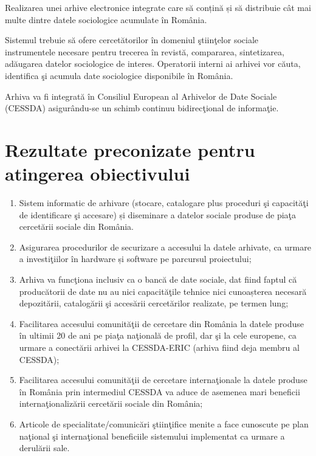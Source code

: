 \documentclass[a4paper, 10pt]{article}
\begin{document}
{{
\foreignlanguage{english}{Realizarea }\foreignlanguage{romanian}{unei arhive electronice integrate care s\u{a}
con\c{t}in\u{a} \c{s}i s\u{a} distribuie c\^at mai multe dintre datele sociologice acumulate \^in Rom\^ania.}}

Sistemul trebuie s\u{a} ofere cercet\u{a}torilor \^in domeniul \c{s}tiin\c{t}elor sociale instrumentele necesare pentru
trecerea \^in revist\u{a}, compararea, sintetizarea, ad\u{a}ugarea datelor sociologice de interes. Operatorii interni
ai arhivei vor c\u{a}uta, identifica \c{s}i acumula date sociologice disponibile \^in Rom\^ania.

Arhiva va fi integrat\u{a} \^in Consiliul European al Arhivelor de Date Sociale (CESSDA) asigur\^andu-se un schimb
continuu bidirec\c{t}ional de informa\c{t}ie.

\section{Rezultate preconizate pentru atingerea obiectivului}

\begin{enumerate}
\item {
Sistem informatic de arhivare (stocare, catalogare plus proceduri \c{s}i capacit\u{a}\c{t}i de identificare \c{s}i
accesare) \foreignlanguage{romanian}{\c{s}}i diseminare a datelor sociale produse de pia\c{t}a cercet\u{a}rii sociale
din Rom\^ania.}
\item {
Asigurarea procedurilor de securizare a accesului la datele arhivate, ca urmare a investi\c{t}iilor \^in hardware
\foreignlanguage{romanian}{\c{s}}i software pe parcursul proiectului;}
\item {
\foreignlanguage{romanian}{Arhiva }va func\c{t}iona inclusiv ca o banc\u{a} de date sociale, dat fiind faptul c\u{a}
produc\u{a}torii de date nu au nici capacit\u{a}\c{t}ile tehnice nici \foreignlanguage{romanian}{cunoa\c{s}terea}
necesar\u{a} depozit\u{a}rii, catalog\u{a}rii \c{s}i acces\u{a}rii cercet\u{a}rilor realizate, pe termen lung;}
\item {
Facilitarea accesului comunit\u{a}\c{t}ii de cercetare din Rom\^ania la datele produse \^in ultimii 20 de ani pe
pia\c{t}a na\c{t}ional\u{a} de profil, dar \c{s}i la cele europene, ca urmare a conect\u{a}rii arhivei la CESSDA-ERIC
(arhiva fiind deja membru al CESSDA);}
\item {
Facilitarea accesului comunit\u{a}\c{t}ii de cercetare interna\c{t}ionale la datele produse \^in Rom\^ania prin
intermediul CESSDA va aduce de asemenea mari beneficii interna\c{t}ionaliz\u{a}rii cercet\u{a}rii sociale din
Rom\^ania;}
\item {
Articole de specialitate/comunic\u{a}ri \c{s}tiin\c{t}ifice menite a face cunoscute pe plan na\c{t}ional \c{s}i
interna\c{t}ional beneficiile sistemului implementat ca urmare a derul\u{a}rii sale.}
\end{enumerate}

}
\end{document}
